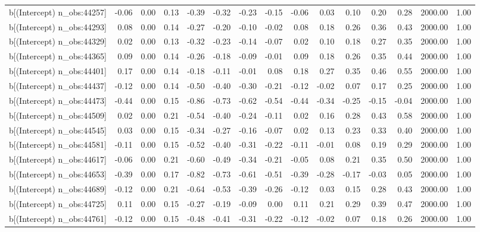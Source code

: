 \begin{table}[ht]
\begin{tabular}{rrrrrrrrrrrrrrr}
  b[(Intercept) n\_obs:44257] & -0.06 & 0.00 & 0.13 & -0.39 & -0.32 & -0.23 & -0.15 & -0.06 & 0.03 & 0.10 & 0.20 & 0.28 & 2000.00 & 1.00 \\ 
  b[(Intercept) n\_obs:44293] & 0.08 & 0.00 & 0.14 & -0.27 & -0.20 & -0.10 & -0.02 & 0.08 & 0.18 & 0.26 & 0.36 & 0.43 & 2000.00 & 1.00 \\ 
  b[(Intercept) n\_obs:44329] & 0.02 & 0.00 & 0.13 & -0.32 & -0.23 & -0.14 & -0.07 & 0.02 & 0.10 & 0.18 & 0.27 & 0.35 & 2000.00 & 1.00 \\ 
  b[(Intercept) n\_obs:44365] & 0.09 & 0.00 & 0.14 & -0.26 & -0.18 & -0.09 & -0.01 & 0.09 & 0.18 & 0.26 & 0.35 & 0.44 & 2000.00 & 1.00 \\ 
  b[(Intercept) n\_obs:44401] & 0.17 & 0.00 & 0.14 & -0.18 & -0.11 & -0.01 & 0.08 & 0.18 & 0.27 & 0.35 & 0.46 & 0.55 & 2000.00 & 1.00 \\ 
  b[(Intercept) n\_obs:44437] & -0.12 & 0.00 & 0.14 & -0.50 & -0.40 & -0.30 & -0.21 & -0.12 & -0.02 & 0.07 & 0.17 & 0.25 & 2000.00 & 1.00 \\ 
  b[(Intercept) n\_obs:44473] & -0.44 & 0.00 & 0.15 & -0.86 & -0.73 & -0.62 & -0.54 & -0.44 & -0.34 & -0.25 & -0.15 & -0.04 & 2000.00 & 1.00 \\ 
  b[(Intercept) n\_obs:44509] & 0.02 & 0.00 & 0.21 & -0.54 & -0.40 & -0.24 & -0.11 & 0.02 & 0.16 & 0.28 & 0.43 & 0.58 & 2000.00 & 1.00 \\ 
  b[(Intercept) n\_obs:44545] & 0.03 & 0.00 & 0.15 & -0.34 & -0.27 & -0.16 & -0.07 & 0.02 & 0.13 & 0.23 & 0.33 & 0.40 & 2000.00 & 1.00 \\ 
  b[(Intercept) n\_obs:44581] & -0.11 & 0.00 & 0.15 & -0.52 & -0.40 & -0.31 & -0.22 & -0.11 & -0.01 & 0.08 & 0.19 & 0.29 & 2000.00 & 1.00 \\ 
  b[(Intercept) n\_obs:44617] & -0.06 & 0.00 & 0.21 & -0.60 & -0.49 & -0.34 & -0.21 & -0.05 & 0.08 & 0.21 & 0.35 & 0.50 & 2000.00 & 1.00 \\ 
  b[(Intercept) n\_obs:44653] & -0.39 & 0.00 & 0.17 & -0.82 & -0.73 & -0.61 & -0.51 & -0.39 & -0.28 & -0.17 & -0.03 & 0.05 & 2000.00 & 1.00 \\ 
  b[(Intercept) n\_obs:44689] & -0.12 & 0.00 & 0.21 & -0.64 & -0.53 & -0.39 & -0.26 & -0.12 & 0.03 & 0.15 & 0.28 & 0.43 & 2000.00 & 1.00 \\ 
  b[(Intercept) n\_obs:44725] & 0.11 & 0.00 & 0.15 & -0.27 & -0.19 & -0.09 & 0.00 & 0.11 & 0.21 & 0.29 & 0.39 & 0.47 & 2000.00 & 1.00 \\ 
  b[(Intercept) n\_obs:44761] & -0.12 & 0.00 & 0.15 & -0.48 & -0.41 & -0.31 & -0.22 & -0.12 & -0.02 & 0.07 & 0.18 & 0.26 & 2000.00 & 1.00 \\ 

\end{tabular}
\end{table}
